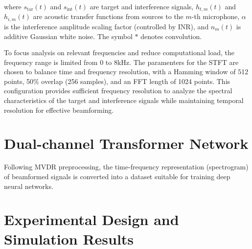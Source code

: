 \documentclass[journal]{IEEEtran}
\begin{document}
where $s_{\text{tar}}(t)$ and $s_{\text{int}}(t)$ are target and interference signals, $h_{t,m}(t)$ and $h_{i,m}(t)$ are acoustic transfer functions from sources to the $m$-th microphone, $\alpha$ is the interference amplitude scaling factor (controlled by INR), and $n_m(t)$ is additive Gaussian white noise. The symbol $*$ denotes convolution.

To focus analysis on relevant frequencies and reduce computational load, the frequency range is limited from 0 to 8kHz. The paramenters for the STFT are chosen to balance time and frequency resolution, with a Hamming window of 512 points, 50\% overlap (256 samples), and an FFT length of 1024 points. This configuration provides sufficient frequency resolution to analyze the spectral characteristics of the target and interference signals while maintaining temporal resolution for effective beamforming.

\section{Dual-channel Transformer Network}
\label{Transformer Network}
Following MVDR preprocessing, the time-frequency representation (spectrogram) of beamformed signals is converted into a dataset suitable for training deep neural networks. 

\section{Experimental Design and Simulation Results}
\label{experiments}
\end{document}
